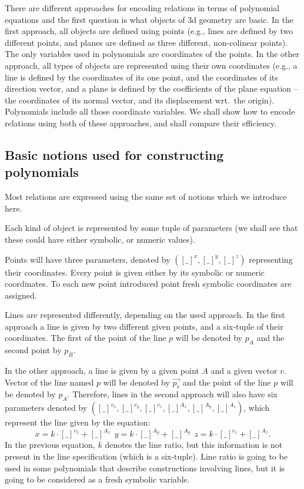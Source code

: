\documentclass[final,1p,times,authoryear]{elsarticle}
\begin{document}
There are different approaches for encoding relations in terms of
polynomial equations and the first question is what objects of 3d
geometry are basic. %
In the first approach, all objects are defined using points (e.g.,
lines are defined by two different points, and planes are defined as
three different, non-colinear points). The only variables used in
polynomials are coordinates of the points. In the other approach, all
types of objects are represented using their own coordinates (e.g., a
line is defined by the coordinates of its one point, and the
coordinates of its direction vector, and a plane is defined by the
coefficients of the plane equation -- the coordinates of its normal
vector, and its displacement wrt.~the origin). Polynomials include all
those coordinate variables. We shall show how to encode relations
using both of these approaches, and shall compare their efficiency.


\subsection{Basic notions used for constructing polynomials}
Most relations are expressed using the same set of notions which we
introduce here.

Each kind of object is represented by some tuple of parameters (we
shall see that these could have either symbolic, or numeric values).

Points will have three parameters, denoted by
$({[\_]}^x, {[\_]}^y, {[\_]}^z)$ representing their coordinates. Every
point is given either by its symbolic or numeric coordinates. To each
new point introduced point fresh symbolic coordinates are assigned.

Lines are represented differently, depending on the used approach.  In
the first approach a line is given by two different given points, and
a six-tuple of their coordinates. The first of the point of the line
$p$ will be denoted by $p_A$ and the second point by $p_B$.

In the other approach, a line is given by a given point $A$ and a
given vector $v$. Vector of the line named $p$ will be denoted by
$\overrightarrow{p_v}$ and the point of the line $p$ will be denoted by
$p_A$. Therefore, lines in the second approach will also have six
parameters denoted by
$({[\_]}^{v_x}, {[\_]}^{v_y}, {[\_]}^{v_z}, {[\_]}^{A_x},
{[\_]}^{A_y}, {[\_]}^{A_z})$,
which represent the line given by the equation:
$$x = k\cdot[\_]^{v_x} + {[\_]}^{A_x}\ \ y = k\cdot[\_]^{A_y} +
{[\_]}^{A_y}\ \ z = k\cdot[\_]^{v_z} + {[\_]}^{A_z}.$$
In the previous equation, $k$ denotes the line ratio, but this
information is not present in the line specification (which is a
six-tuple). Line ratio is going to be used in some polynomials that
describe constructions involving lines, but it is going to be
considered as a fresh symbolic variable.
\end{document}

